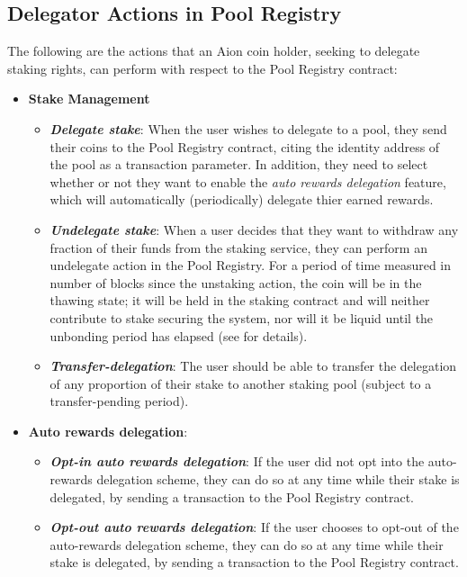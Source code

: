 \subsection{Delegator Actions in Pool Registry}
The following are the actions that an Aion coin holder, seeking to delegate staking rights, can perform with respect to the Pool Registry contract: 
\begin{itemize}
    \item \textbf{Stake Management}
    \begin{itemize}
        \item \textit{\textbf{Delegate stake}}: When the user wishes to delegate to a pool, they send their coins to the Pool Registry contract, citing the identity address of the pool as a transaction parameter. In addition, they need to select whether or not they want to enable the \textit{auto rewards delegation} feature, which will automatically (periodically) delegate thier earned rewards. 
        \item \textit{\textbf{Undelegate stake}}: When a user decides that they want to withdraw any fraction of their funds from the staking service, they can perform an undelegate action in the Pool Registry. For a period of time measured in number of blocks since the unstaking action, the coin will be in the thawing state; it will be held in the staking contract and will neither contribute to stake securing the system, nor will it be liquid until the unbonding period has elapsed (see \cite{WZS19} for details).
        \item \textit{\textbf{Transfer-delegation}}: The user should be able to transfer the delegation of any proportion of their stake to another staking pool (subject to a transfer-pending period).
    \end{itemize}
    \clearpage
    \item \textbf{Auto rewards delegation}: 
    \begin{itemize}
        \item \textit{\textbf{Opt-in auto rewards delegation}}: If the user did not opt into the auto-rewards delegation scheme, they can do so at any time while their stake is delegated, by sending a transaction to the Pool Registry contract. 
        \item \textit{\textbf{Opt-out auto rewards delegation}}: If the user chooses to opt-out of the auto-rewards delegation scheme, they can do so at any time while their stake is delegated, by sending a transaction to the Pool Registry contract.  
    \end{itemize}

\end{itemize}
